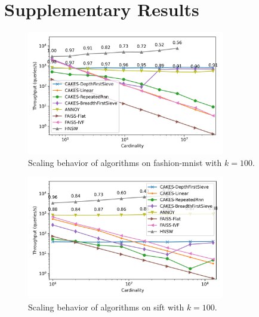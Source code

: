 % 
% 
% 
% 
% 
% 
% 
% 
% 
% 

% 

\section{Supplementary Results}

\begin{figure}[ht!]
    \centering
    \includegraphics[width=3.4in]{plots/fashion-mnist-knn-100.png}
    \caption{
        Scaling behavior of algorithms on fashion-mnist with $k=100$. 
    }
    \label{fig:supplement:fashion-mnist-k-100}
\end{figure}

\begin{figure}[ht!]
    \centering
    \includegraphics[width=3.4in]{plots/sift-knn-100.png}
    \caption{
        Scaling behavior of algorithms on sift with $k=100$. 
    }
    \label{fig:supplement:sift-k-100}
\end{figure}

